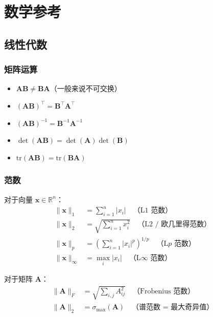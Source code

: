 %
%

\appendix

\chapter{数学参考}

\section{线性代数}

\subsection{矩阵运算}

\begin{itemize}
    \item $\mathbf{AB} \neq \mathbf{BA}$（一般来说不可交换）
    \item $(\mathbf{AB})^\top = \mathbf{B}^\top\mathbf{A}^\top$
    \item $(\mathbf{AB})^{-1} = \mathbf{B}^{-1}\mathbf{A}^{-1}$
    \item $\det(\mathbf{AB}) = \det(\mathbf{A})\det(\mathbf{B})$
    \item $\text{tr}(\mathbf{AB}) = \text{tr}(\mathbf{BA})$
\end{itemize}

\subsection{范数}

对于向量 $\mathbf{x} \in \mathbb{R}^n$：
\begin{align}
\|\mathbf{x}\|_1 &= \sum_{i=1}^{n} |x_i| \quad \text{（L1 范数）} \\
\|\mathbf{x}\|_2 &= \sqrt{\sum_{i=1}^{n} x_i^2} \quad \text{（L2 / 欧几里得范数）} \\
\|\mathbf{x}\|_p &= \left(\sum_{i=1}^{n} |x_i|^p\right)^{1/p} \quad \text{（L$p$ 范数）} \\
\|\mathbf{x}\|_\infty &= \max_i |x_i| \quad \text{（L$\infty$ 范数）}
\end{align}

对于矩阵 $\mathbf{A}$：
\begin{align}
\|\mathbf{A}\|_F &= \sqrt{\sum_{i,j} A_{ij}^2} \quad \text{（Frobenius 范数）} \\
\|\mathbf{A}\|_2 &= \sigma_{\max}(\mathbf{A}) \quad \text{（谱范数 = 最大奇异值）}
\end{align}

